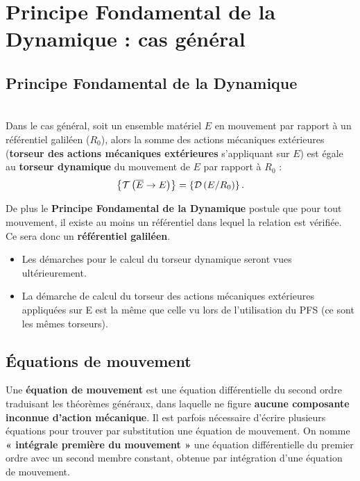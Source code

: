 \documentclass[10pt,fleqn]{article} %
\begin{document}

\section[PFD : cas général]{Principe Fondamental de la Dynamique : cas général}

\subsection{Principe Fondamental de la Dynamique}

\begin{definition} ~\\
Dans le cas général, soit un ensemble matériel $E$ en mouvement par rapport à un référentiel galiléen ($R_0$), alors la somme des actions mécaniques extérieures (\textbf{torseur des actions mécaniques extérieures} s'appliquant sur $E$) est égale au \textbf{torseur dynamique} du mouvement de $E$ par rapport à $R_0$ :
$$
\left\{\mathcal{T} \left(\overline{E}\rightarrow E \right) \right\}=\left\{\mathcal{D} \left(E/R_0 \right) \right\}.
$$

De plus le \textbf{Principe Fondamental de la Dynamique} postule que pour tout mouvement, il existe au moins un référentiel dans lequel la relation est vérifiée. Ce sera donc un \textbf{référentiel galiléen}.

\end{definition}

\begin{rem}
\begin{itemize}
\item Les démarches pour le calcul du torseur dynamique seront vues ultérieurement.
\item La démarche de calcul du torseur des actions mécaniques extérieures appliquées sur E est la  même que celle vu lors de l'utilisation du PFS (ce sont les mêmes torseurs). 
\end{itemize}
\end{rem}

\subsection{Équations de mouvement}

\begin{definition}
Une \textbf{équation de mouvement} est une équation différentielle du second ordre traduisant les théorèmes généraux, dans laquelle ne figure \textbf{aucune composante inconnue d'action mécanique}. Il est parfois nécessaire d'écrire plusieurs équations pour trouver par substitution une équation de mouvement. On nomme \textbf{« intégrale première du mouvement »} une équation différentielle du premier ordre avec un second membre constant, obtenue par  intégration d'une équation de mouvement. 
\end{definition}
\end{document}
